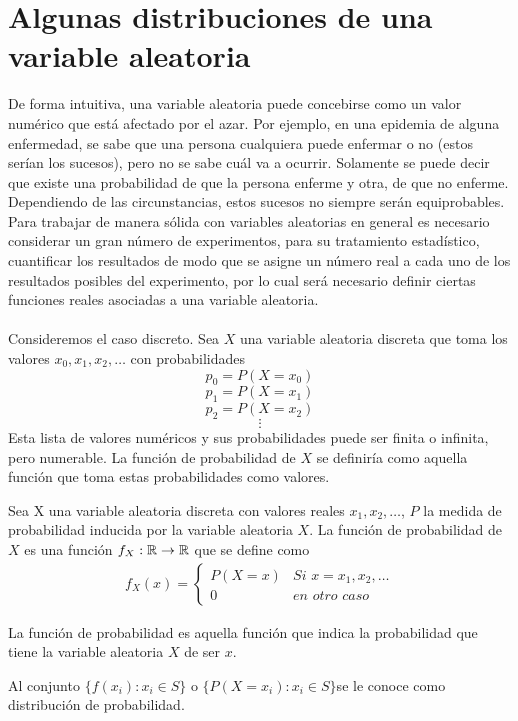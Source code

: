 \section{Algunas distribuciones de una variable aleatoria}
De forma intuitiva, una variable aleatoria puede concebirse como un valor numérico que está afectado por el azar. Por ejemplo, en una epidemia de alguna enfermedad, se sabe que una persona cualquiera puede enfermar o no (estos serían los sucesos), pero no se sabe cuál va a ocurrir. Solamente se puede decir que existe una probabilidad de que la persona enferme y otra, de que no enferme. Dependiendo de las circunstancias, estos sucesos no siempre serán equiprobables.\\
Para trabajar de manera sólida con variables aleatorias en general es necesario considerar un gran número de experimentos, para su tratamiento estadístico, cuantificar los resultados de modo que se asigne un número real a cada uno de los resultados posibles del experimento, por lo cual será necesario definir ciertas funciones reales asociadas a una variable aleatoria.
\\\\
Consideremos el caso discreto. Sea $X$ una variable aleatoria discreta que toma los valores $x_0,x_1,x_2,\ldots$ con probabilidades
$$p_0=P(X=x_0)$$
$$p_1=P(X=x_1)$$
$$p_2=P(X=x_2)$$
$$\vdots$$
Esta lista de valores numéricos y sus probabilidades puede ser finita o infinita, pero numerable. La función de probabilidad de $X$ se definiría como aquella función que toma estas probabilidades como valores.
\begin{Def}
    Sea X una variable aleatoria discreta con valores reales $x_1,x_2,\ldots$, $P$ la medida de probabilidad inducida por la variable aleatoria $X$. La función de probabilidad de $X$ es una función  $f_{X}:{\mathbb{R}}\rightarrow{\mathbb{R}}$ que se define como
    \begin{eqnarray*}
        f_{X}(x)=
        \begin{cases}
            P(X=x) &\textit{Si }x=x_1,x_2,\ldots\\0 &\textit{en otro caso}\label{def-funcionProbabilidad}
        \end{cases}
    \end{eqnarray*}
\end{Def}
La función de probabilidad es aquella función que indica la probabilidad que tiene la variable aleatoria $X$ de ser $x$.
\begin{Def}
\label{def-distribuciónProb}
    Al conjunto $\{f(x_i): x_i\in S\}$ o $\{P(X=x_i): x_i\in S\} $se le conoce como distribución de probabilidad.
\end{Def}
